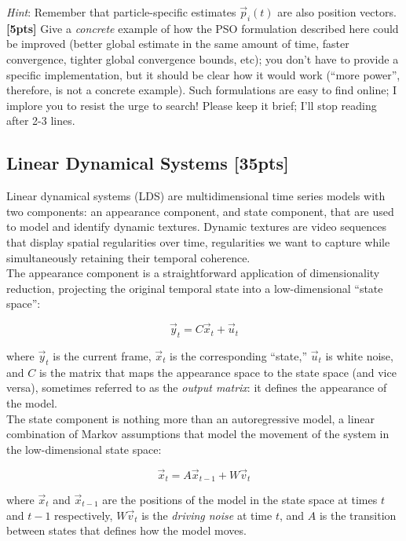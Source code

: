 \documentclass[paper=a4, fontsize=11pt]{scrartcl} %
\numberwithin{figure}{section} %
\numberwithin{table}{section} %
\begin{document}
\emph{Hint}: Remember that particle-specific estimates $\vec{p}_i(t)$ are also position vectors. \\

\textbf{[5pts]} Give a \emph{concrete} example of how the PSO formulation described here could be improved (better global estimate in the same amount of time, faster convergence, tighter global convergence bounds, etc); you don't have to provide a specific implementation, but it should be clear how it would work (``more power'', therefore, is not a concrete example). Such formulations are easy to find online; I implore you to resist the urge to search! Please keep it brief; I'll stop reading after 2-3 lines.

\subsection{Linear Dynamical Systems \textbf{[35pts]}}

Linear dynamical systems (LDS) are multidimensional time series models with two components: an appearance component, and state component, that are used to model and identify dynamic textures. Dynamic textures are video sequences that display spatial regularities over time, regularities we want to capture while simultaneously retaining their temporal coherence. \\

The appearance component is a straightforward application of dimensionality reduction, projecting the original temporal state into a low-dimensional ``state space'':

$$
\vec{y}_t = C\vec{x}_t + \vec{u}_t
$$

where $\vec{y}_t$ is the current frame, $\vec{x}_t$ is the corresponding ``state,'' $\vec{u}_t$ is white noise, and $C$ is the matrix that maps the appearance space to the state space (and vice versa), sometimes referred to as the \emph{output matrix}: it defines the appearance of the model. \\

The state component is nothing more than an autoregressive model, a linear combination of Markov assumptions that model the movement of the system in the low-dimensional state space:

$$
\vec{x}_t = A\vec{x}_{t - 1} + W\vec{v}_t
$$

where $\vec{x}_t$ and $\vec{x}_{t - 1}$ are the positions of the model in the state space at times $t$ and $t - 1$ respectively, $W\vec{v}_t$ is the \emph{driving noise} at time $t$, and $A$ is the transition between states that defines how the model moves. \\
\end{document}
